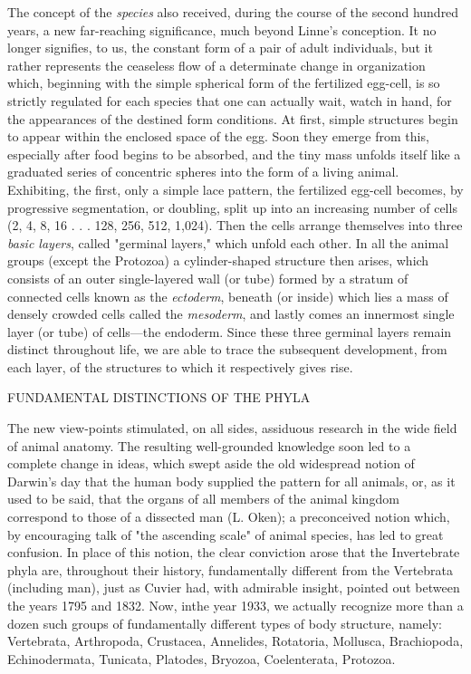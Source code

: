 The concept of the \textit{species} also received, during the course of the second hundred years, a
new far-reaching significance, much beyond Linne's conception. It no longer signifies, to us,
the constant form of a pair of adult individuals, but it rather represents the ceaseless flow of a
determinate change in organization which, beginning with the simple spherical form of the
fertilized egg-cell, is so strictly regulated for each species that one can actually wait, watch in
hand, for the appearances of the destined form conditions. At first, simple structures begin to
appear within the enclosed space of the egg. Soon they emerge from this, especially after
food begins to be absorbed, and the tiny mass unfolds itself like a graduated series of
concentric spheres into the form of a living animal. Exhibiting, the first, only a simple lace
pattern, the fertilized egg-cell becomes, by progressive segmentation, or doubling, split up
into an increasing number of cells (2, 4, 8, 16 . . . 128, 256, 512, 1,024). Then the cells
arrange themselves into three \textit{basic layers}, called "germinal layers," which unfold each other.
In all the animal groups (except the Protozoa) a cylinder-shaped structure then arises, which
consists of an outer single-layered wall (or tube) formed by a stratum of connected cells
known as the \textit{ectoderm}, beneath (or inside) which lies a mass of densely crowded cells called
the \textit{mesoderm}, and lastly comes an innermost single layer (or tube) of cells—the endoderm.
Since these three germinal layers remain distinct throughout life, we are able to trace the
subsequent development, from each layer, of the structures to which it respectively gives rise.

FUNDAMENTAL DISTINCTIONS OF THE PHYLA

The new view-points stimulated, on all sides, assiduous research in the wide field of animal
anatomy. The resulting well-grounded knowledge soon led to a complete change in ideas,
which swept aside the old widespread notion of Darwin's day that the human body supplied
the pattern for all animals, or, as it used to be said, that the organs of all members of the
animal kingdom correspond to those of a dissected man (L. Oken); a preconceived notion
which, by encouraging talk of "the ascending scale" of animal species, has led to great
confusion. In place of this notion, the clear conviction arose that the Invertebrate phyla are,
throughout their history, fundamentally different from the Vertebrata (including man), just as
Cuvier had, with admirable insight, pointed out between the years 1795 and 1832. Now, inthe year 1933, we actually recognize more than a dozen such groups of fundamentally
different types of body structure, namely: Vertebrata, Arthropoda, Crustacea, Annelides,
Rotatoria, Mollusca, Brachiopoda, Echinodermata, Tunicata, Platodes, Bryozoa,
Coelenterata, Protozoa.

